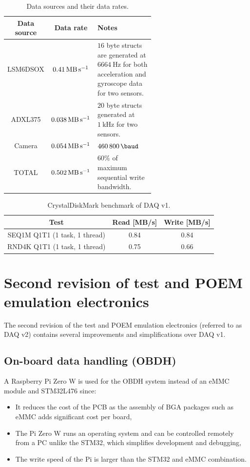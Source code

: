 \documentclass[a4paper,11pt]{article}
\begin{document}
\begin{table}[H]
\centering
\label{tabl:daq-v1-sensor-datarate}
\begin{tabular}{|c|c|p{0.6\linewidth}|}
  Data source & Data rate  & Notes \\ 
  \hline
  LSM6DSOX & $\SI{0.41}{\mega\byte\per\second}$ & $16$ byte structs are generated at $\SI{6664}{\hertz}$ for both acceleration and gyroscope data for two sensors.\\
  ADXL375  & $\SI{0.038}{\mega\byte\per\second}$ & $20$ byte structs generated at $\SI{1}{\kilo\hertz}$ for two sensors.\\
  Camera  & $\SI{0.054}{\mega\byte\per\second}$ & $\SI{460800}{\baud}$ \\
  TOTAL   & $\SI{0.502}{\mega\byte\per\second}$ & $60\%$ of maximum sequential write bandwidth.
\end{tabular}
\caption{Data sources and their data rates.}
\end{table}

\begin{table}[H]
\centering
\begin{tabular}{|c|c|c|}
  Test  & Read [MB/s] & Write [MB/s]\\
  \hline
  SEQ1M Q1T1 (1 task, 1 thread)     & 0.84  & 0.84\\
  RND4K Q1T1 (1 task, 1 thread)     & 0.75  & 0.66\\
\end{tabular}
\caption{CrystalDiskMark benchmark of DAQ v1.}
\label{tabl:daq-v1-diskmark}
\end{table}

\section{Second revision of test and POEM emulation electronics}
The second revision of the test and POEM emulation electronics (referred to as DAQ v2) contains several improvements and simplifications over DAQ v1.

\subsection{On-board data handling (OBDH)}
A Raspberry Pi Zero W is used for the OBDH system instead of an eMMC module and STM32L476 since:
\begin{itemize}
  \item It reduces the cost of the PCB as the assembly of BGA packages such as eMMC adds significant cost per board,
  \item The Pi Zero W runs an operating system and can be controlled remotely from a PC unlike the STM32, which simplifies development and debugging,
  \item The write speed of the Pi is larger than the STM32 and eMMC combination. %
\end{itemize}
\end{document}
